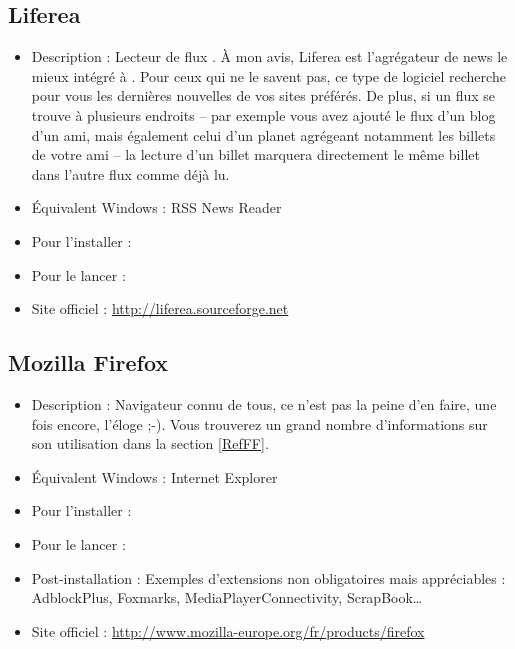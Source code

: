 \subsection{Liferea}
\label{RefInstallLiferea}
\begin{itemize}
\begingroup
{}
\item Description : Lecteur de flux . À mon avis, Liferea est l'agrégateur de news le mieux intégré à . Pour ceux qui ne le savent pas, ce type de logiciel recherche pour vous les dernières nouvelles de vos sites préférés. De plus, si un flux se trouve à plusieurs endroits -- par exemple vous avez ajouté le flux d'un blog d'un ami, mais également celui d'un planet agrégeant notamment les billets de votre ami -- la lecture d'un billet marquera directement le même billet dans l'autre flux comme déjà lu.{\par}
\item Équivalent Windows : RSS News Reader{\par}
\item Pour l'installer : 
\item Pour le lancer : 
\item Site officiel : \url{http://liferea.sourceforge.net}{\par}
\endgroup
\end{itemize}

\subsection{Mozilla Firefox}
\begin{itemize}
\begingroup
{}
\item Description : Navigateur connu de tous, ce n'est pas la peine d'en faire, une fois encore, l'éloge ;-). Vous trouverez un grand nombre d'informations sur son utilisation dans la section \ref{RefFF}.{\par}
\endgroup
\item Équivalent Windows : Internet Explorer{\par}
\item Pour l'installer : 
\item Pour le lancer : 
\item Post-installation : Exemples d'extensions non obligatoires mais appréciables : AdblockPlus, Foxmarks, MediaPlayerConnectivity, ScrapBook\ldots{}{\par}
\item Site officiel : \url{http://www.mozilla-europe.org/fr/products/firefox}{\par}
\end{itemize}
